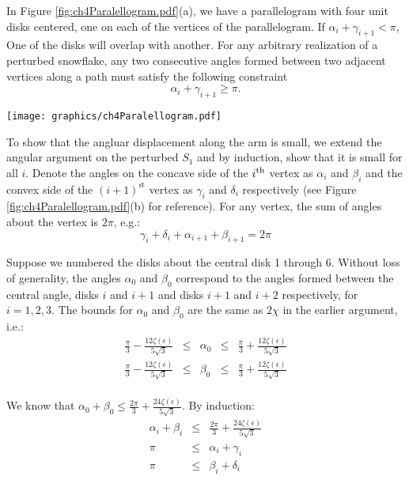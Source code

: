 In Figure \ref{fig:ch4Paralellogram.pdf}(a), we have a parallelogram with four unit disks centered, one on each of the vertices of the parallelogram.  
If $\alpha_i + \gamma_{i+1} < \pi$, One of the disks will overlap with another.  
For any arbitrary realization of a perturbed snowflake, any two consecutive angles formed between two adjacent vertices along a path must satisfy the following constraint $$\alpha_i + \gamma_{i+1} \geq \pi.$$

\begin{minipage}{\linewidth}
\begin{center}
\texttt{[image: graphics/ch4Paralellogram.pdf]}
\label{fig:ch4Paralellogram.pdf}
\end{center}
\end{minipage}

To show that the angluar displacement along the arm is small, we extend the angular argument on the perturbed $S_1$ and by induction, show that it is small for all $i$.  
Denote the angles on the concave side of the $i^\text{th}$ vertex as $\alpha_i$ and $\beta_i$ and the convex side of the $(i+1)^\text{st}$ vertex as $\gamma_i$ and $\delta_i$ respectively (see Figure \ref{fig:ch4Paralellogram.pdf}(b) for reference). 
For any vertex, the sum of angles about the vertex is $2 \pi$, e.g.:
$$\gamma_i + \delta_i + \alpha_{i+1} + \beta_{i+1} = 2 \pi$$ 

Suppose we numbered the disks about the central disk 1 through 6.  
Without loss of generality, the angles $\alpha_0$ and $\beta_0$ correspond to the angles formed between the central angle, disks $i$ and $i+1$ and disks $i+1$ and $i+2$ respectively, for $i = 1,2,3$.  
The bounds for $\alpha_0$ and $\beta_0$ are the same as $2\chi$ in the earlier argument, i.e.:
$$
\begin{array}{rcccl}
\frac{\pi}{3} - \frac{12 \zeta(\epsilon)}{5\sqrt{3}} &\leq& \alpha_0 &\leq& \frac{\pi}{3} + \frac{12 \zeta(\epsilon)}{5\sqrt{3}}\\
\frac{\pi}{3} - \frac{12 \zeta(\epsilon)}{5\sqrt{3}} &\leq& \beta_0 &\leq& \frac{\pi}{3} + \frac{12 \zeta(\epsilon)}{5\sqrt{3}}\\
\end{array}
$$

We know that $\alpha_0 + \beta_0 \leq \frac{2\pi}{3} + \frac{24 \zeta(\epsilon)}{5\sqrt{3}}.$
By induction: 
$$
\begin{array}{rcl}
\alpha_i +\beta_i &\leq& \frac{2 \pi}{3} + \frac{24 \zeta(\epsilon)}{5\sqrt3}\\
\pi &\leq& \alpha_i + \gamma_i \\
\pi &\leq& \beta_i + \delta_i
\end{array}
$$

